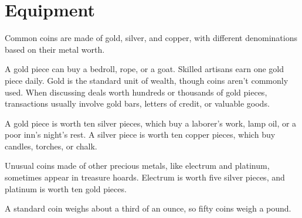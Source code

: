 \section{Equipment}\label{_equipment_4}

Common coins are made of gold, silver, and copper, with different
denominations based on their metal worth.

A gold piece can buy a bedroll, rope, or a goat. Skilled artisans earn
one gold piece daily. Gold is the standard unit of wealth, though coins
aren't commonly used. When discussing deals worth hundreds or thousands
of gold pieces, transactions usually involve gold bars, letters of
credit, or valuable goods.

A gold piece is worth ten silver pieces, which buy a laborer's work,
lamp oil, or a poor inn's night's rest. A silver piece is worth ten
copper pieces, which buy candles, torches, or chalk.

Unusual coins made of other precious metals, like electrum and platinum,
sometimes appear in treasure hoards. Electrum is worth five silver
pieces, and platinum is worth ten gold pieces.

A standard coin weighs about a third of an ounce, so fifty coins weigh a
pound.


